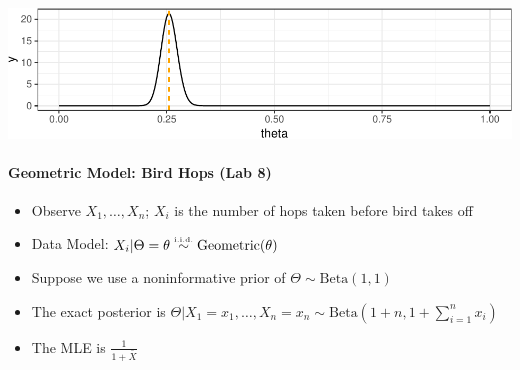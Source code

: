 \documentclass[]{article}
\newenvironment{Shaded}{\begin{snugshade}}{\end{snugshade}}
\newcommand{\KeywordTok}[1]{\textcolor[rgb]{0.13,0.29,0.53}{\textbf{#1}}}
\newcommand{\DataTypeTok}[1]{\textcolor[rgb]{0.13,0.29,0.53}{#1}}
\newcommand{\DecValTok}[1]{\textcolor[rgb]{0.00,0.00,0.81}{#1}}
\newcommand{\StringTok}[1]{\textcolor[rgb]{0.31,0.60,0.02}{#1}}
\newcommand{\OperatorTok}[1]{\textcolor[rgb]{0.81,0.36,0.00}{\textbf{#1}}}
\newcommand{\NormalTok}[1]{#1}
\providecommand{\tightlist}{%
  \setlength{\itemsep}{0pt}\setlength{\parskip}{0pt}}
\let\oldparagraph\paragraph
\renewcommand{\paragraph}[1]{\oldparagraph{#1}\mbox{}}
\begin{document}
\includegraphics{20190306_normal_approx_posterior_files/figure-latex/unnamed-chunk-1-1.pdf}

\paragraph{Geometric Model: Bird Hops (Lab
8)}\label{geometric-model-bird-hops-lab-8}

\begin{itemize}
\tightlist
\item
  Observe \(X_1, \ldots, X_n\); \(X_i\) is the number of hops taken
  before bird takes off
\item
  Data Model: \(X_i | \Theta = \theta \stackrel{{\mbox{\text{\tiny i.i.d.}}}}{\sim} \text{Geometric}(\theta)\)
\item
  Suppose we use a noninformative prior of
  \(\Theta \sim \text{Beta}(1, 1)\)
\item
  The exact posterior is
  \(\Theta | X_1 = x_1, \ldots, X_n = x_n \sim \text{Beta}(1 + n, 1 + \sum_{i = 1}^n x_i)\)
\item
  The MLE is \(\frac{1}{1 + \bar{X}}\)
\end{itemize}

\begin{Shaded}
\end{Shaded}
\end{document}
